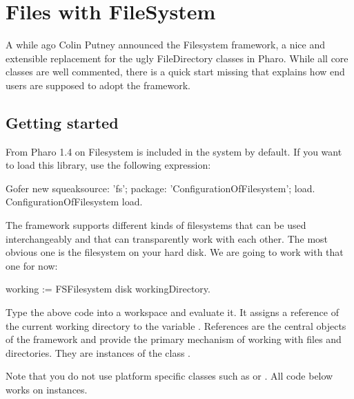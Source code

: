 \documentclass[a4paper,10pt,twoside]{book}
\begin{document}
\fi
\sloppy
\chapter{Files with FileSystem }
\chapterauthor{\authorsteph{}}


A while ago Colin Putney announced the Filesystem framework, a nice and extensible replacement for the ugly FileDirectory classes in Pharo. While all core classes are well commented, there is a quick start missing that explains how end users are supposed to adopt the framework. 

\section{Getting started}
From Pharo 1.4 on Filesystem is included in the system by default. If you want to load this library, use the following expression:

\begin{code}{}
Gofer new
  squeaksource: 'fs'; 
  package: 'ConfigurationOfFilesystem';
  load.
ConfigurationOfFilesystem load.
\end{code}     

The framework supports different kinds of filesystems that can be used interchangeably and that can transparently work with each other. The most obvious one is the filesystem on your hard disk. We are going to work with that one for now:

\begin{code}{}
working := FSFilesystem disk workingDirectory.
\end{code} 

Type the above code into a workspace and evaluate it. It assigns a reference of the current working directory to the variable . References are the central objects of the framework and provide the primary mechanism of working with files and directories. They are instances of the class .

Note that you do not use platform specific classes such as  or . All code below works on  instances.
\end{document}
